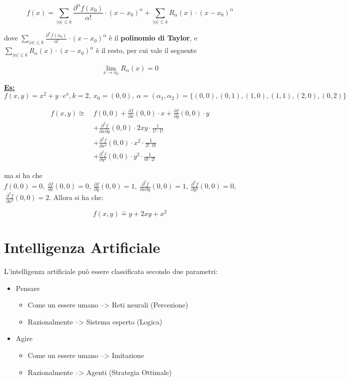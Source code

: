 \documentclass[a4paper,12pt]{article}
\newcommand{\esempio}{\noindent\textbf{\underline{Es:}} }
\begin{document}
 	\[
 	f(x) = \sum_{|\alpha| \leq k} \frac{\partial ^\alpha f(x_0)}{\alpha !} \cdot (x - x_0)^\alpha + \sum_{|\alpha| \leq k} R_\alpha (x) \cdot (x - x_0)^\alpha
 	\]

 	dove $ \sum_{|\alpha| \leq k} \frac{\partial ^\alpha f(x_0)}{\alpha !} \cdot (x - x_0)^\alpha$ è il \textbf{polinomio di Taylor}, e $\sum_{|\alpha| \leq k} R_\alpha (x) \cdot (x - x_0)^\alpha$ è il resto, per cui vale il seguente

 	\[
 	\lim_{x \rightarrow x_0} R_\alpha(x) = 0
 	\]

 	\esempio $f(x,y) = x^2 + y\cdot e^x, k = 2, \ x_0 = (0,0), \ \alpha = (\alpha_1, \alpha_2) = \{(0,0), (0,1), (1,0),(1,1), (2,0), (0,2) \}$

 	\begin{align*}
 		f(x, y) \cong \ & f(0,0)
 		+ \frac{\partial f}{\partial x}(0,0) \cdot x
 		+ \frac{\partial f}{\partial y}(0,0) \cdot y \\
 		& + \frac{\partial^2 f}{\partial x \partial y}(0,0) \cdot 2xy \cdot \frac{1}{1! \cdot 1!} \\
 		& + \frac{\partial^2 f}{\partial x^2}(0,0) \cdot x^2 \cdot \frac{1}{2! \cdot 0!} \\
 		& + \frac{\partial^2 f}{\partial y^2}(0,0) \cdot y^2 \cdot \frac{1}{0! \cdot 2!}
 	\end{align*}

 	ma si ha che $f(0,0) = 0,\ \frac{\partial f}{\partial x}(0,0) = 0,\ \frac{\partial f}{\partial y}(0,0) = 1, \ \frac{\partial^2 f}{\partial x \partial y} (0,0) = 1, \ \frac{\partial^2 f}{\partial y^2}(0,0) = 0,$ $ \ \frac{\partial^2 f}{\partial x^2}(0,0) = 2$. Allora si ha che:

 	\[
 	f(x,y) \stackrel{\sim}{=} y + 2xy + x^2
 	\]


	\section{Intelligenza Artificiale}

	L'intelligenza artificiale può essere classificata secondo due parametri:

	\begin{itemize}
		\item Pensare
		\begin{itemize}
			\item Come un essere umano --> Reti neurali (Percezione)
			\item Razionalmente --> Sistema esperto (Logica)
		\end{itemize}
		\item Agire
		\begin{itemize}
			\item Come un essere umano --> Imitazione
			\item Razionalmente --> Agenti (Strategia Ottimale)
		\end{itemize}
	\end{itemize}
\end{document}
